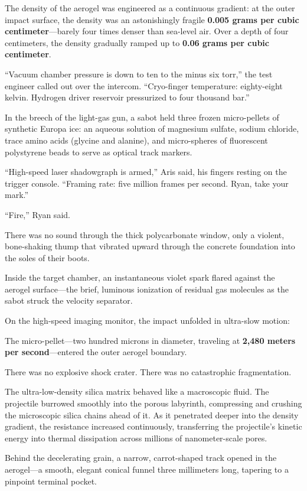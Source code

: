 \documentclass[12pt,twoside,openright]{book}
\begin{document}
The density of the aerogel was engineered as a continuous gradient: at
the outer impact surface, the density was an astonishingly fragile
\textbf{0.005 grams per cubic centimeter}---barely four times denser
than sea-level air. Over a depth of four centimeters, the density
gradually ramped up to \textbf{0.06 grams per cubic centimeter}.

``Vacuum chamber pressure is down to ten to the minus six torr,'' the
test engineer called out over the intercom. ``Cryo-finger temperature:
eighty-eight kelvin. Hydrogen driver reservoir pressurized to four
thousand bar.''

In the breech of the light-gas gun, a sabot held three frozen
micro-pellets of synthetic Europa ice: an aqueous solution of magnesium
sulfate, sodium chloride, trace amino acids (glycine and alanine), and
micro-spheres of fluorescent polystyrene beads to serve as optical track
markers.

``High-speed laser shadowgraph is armed,'' Aris said, his fingers
resting on the trigger console. ``Framing rate: five million frames per
second. Ryan, take your mark.''

``Fire,'' Ryan said.

There was no sound through the thick polycarbonate window, only a
violent, bone-shaking thump that vibrated upward through the concrete
foundation into the soles of their boots.

Inside the target chamber, an instantaneous violet spark flared against
the aerogel surface---the brief, luminous ionization of residual gas
molecules as the sabot struck the velocity separator.

On the high-speed imaging monitor, the impact unfolded in ultra-slow
motion:

The micro-pellet---two hundred microns in diameter, traveling at
\textbf{2,480 meters per second}---entered the outer aerogel boundary.

There was no explosive shock crater. There was no catastrophic
fragmentation.

The ultra-low-density silica matrix behaved like a macroscopic fluid.
The projectile burrowed smoothly into the porous labyrinth, compressing
and crushing the microscopic silica chains ahead of it. As it penetrated
deeper into the density gradient, the resistance increased continuously,
transferring the projectile's kinetic energy into thermal dissipation
across millions of nanometer-scale pores.

Behind the decelerating grain, a narrow, carrot-shaped track opened in
the aerogel---a smooth, elegant conical funnel three millimeters long,
tapering to a pinpoint terminal pocket.
\end{document}
